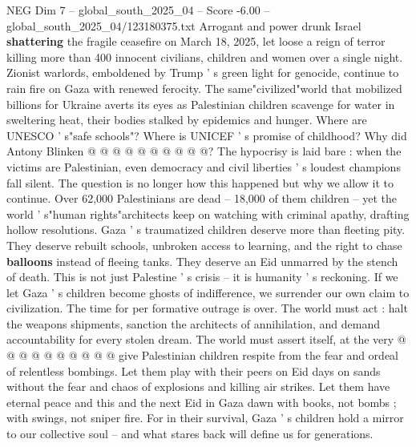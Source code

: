 \begin{textsample}{NEG Dim 7 – global\_south\_2025\_04 – Score -6.00 – global\_south\_2025\_04/123180375.txt}
Arrogant and power drunk Israel \textbf{shattering} the fragile ceasefire on March 18, 2025, let loose a reign of terror killing more than 400 innocent civilians, children and women over a single night.
Zionist warlords, emboldened by Trump ' s green light for genocide, continue to rain fire on Gaza with renewed ferocity.
The same"civilized"world that mobilized billions for Ukraine averts its eyes as Palestinian children scavenge for water in sweltering heat, their bodies stalked by epidemics and hunger.
Where are UNESCO ' s"safe schools"?
Where is UNICEF ' s promise of childhood?
Why did Antony Blinken @ @ @ @ @ @ @ @ @ @?
The hypocrisy is laid bare : when the victims are Palestinian, even democracy and civil liberties ' s loudest champions fall silent.
The question is no longer how this happened but why we allow it to continue.
Over 62,000 Palestinians are dead -- 18,000 of them children -- yet the world ' s"human rights"architects keep on watching with criminal apathy, drafting hollow resolutions.
Gaza ' s traumatized children deserve more than fleeting pity.
They deserve rebuilt schools, unbroken access to learning, and the right to chase \textbf{balloons} instead of fleeing tanks.
They deserve an Eid unmarred by the stench of death.
This is not just Palestine ' s crisis -- it is humanity ' s reckoning.
If we let Gaza ' s children become ghosts of indifference, we surrender our own claim to civilization.
The time for per formative outrage is over.
The world must act : halt the weapons shipments, sanction the architects of annihilation, and demand accountability for every stolen dream.
The world must assert itself, at the very @ @ @ @ @ @ @ @ @ @ give Palestinian children respite from the fear and ordeal of relentless bombings.
Let them play with their peers on Eid days on sands without the fear and chaos of explosions and killing air strikes.
Let them have eternal peace and this and the next Eid in Gaza dawn with books, not bombs ; with swings, not sniper fire.
For in their survival, Gaza ' s children hold a mirror to our collective soul -- and what stares back will define us for generations.

\end{textsample}
